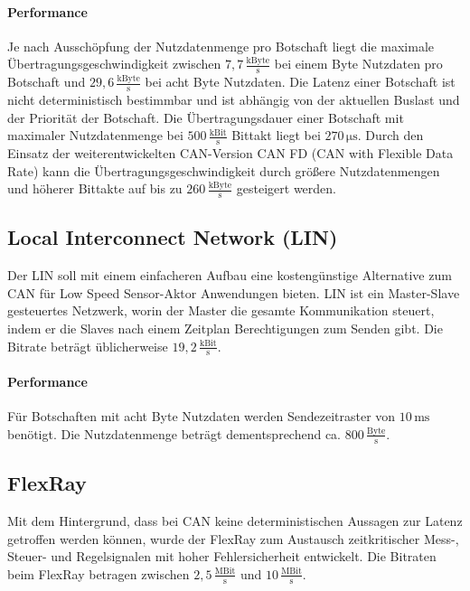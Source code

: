 \paragraph{Performance}
Je nach Ausschöpfung der Nutzdatenmenge pro Botschaft liegt die maximale Übertragungsgeschwindigkeit zwischen $ 7,7\,\frac{\mathrm{kByte}}{\mathrm{s}} $ bei einem Byte Nutzdaten pro Botschaft und $ 29,6\,\frac{\mathrm{kByte}}{\mathrm{s}} $ bei acht Byte Nutzdaten. Die Latenz einer Botschaft ist nicht deterministisch bestimmbar und ist abhängig von der aktuellen Buslast und der Priorität der Botschaft. Die Übertragungsdauer einer Botschaft mit maximaler Nutzdatenmenge bei $ 500\,\frac{\mathrm{kBit}}{\mathrm{s}} $ Bittakt liegt bei $ 270\,\mathrm{\mu s}$.
Durch den Einsatz der weiterentwickelten CAN-Version CAN FD (CAN with Flexible Data Rate) kann die Übertragungsgeschwindigkeit durch größere Nutzdatenmengen und höherer Bittakte auf bis zu $ 260\,\frac{\mathrm{kByte}}{\mathrm{s}} $ gesteigert werden. \cite[Vgl. Seite 76 ff.]{Zimmermann.2014}
\subsection{Local Interconnect Network (LIN)} 
Der LIN soll mit einem einfacheren Aufbau eine kostengünstige Alternative zum CAN für Low Speed Sensor-Aktor Anwendungen bieten.
LIN ist ein Master-Slave gesteuertes Netzwerk, worin der Master die gesamte Kommunikation steuert, indem er die Slaves nach einem Zeitplan Berechtigungen zum Senden gibt. Die Bitrate beträgt üblicherweise $ 19,2\,\frac{\mathrm{kBit}}{\mathrm{s}} $. \cite[Vgl. Seite 79 ff.]{Zimmermann.2014}
\paragraph{Performance}
Für Botschaften mit acht Byte Nutzdaten werden Sendezeitraster von $ 10\,\mathrm{ms} $ benötigt. Die Nutzdatenmenge beträgt dementsprechend ca. $ 800\,\frac{\mathrm{Byte}}{\mathrm{s}} $. \cite[Vgl. Seite 94 f.]{Zimmermann.2014}
\subsection{FlexRay}
Mit dem Hintergrund, dass bei CAN keine deterministischen Aussagen zur Latenz getroffen werden können, wurde der FlexRay zum Austausch zeitkritischer Mess-, Steuer- und Regelsignalen mit hoher Fehlersicherheit entwickelt. Die Bitraten beim FlexRay betragen zwischen $ 2,5\,\frac{\mathrm{MBit}}{\mathrm{s}} $ und $ 10\,\frac{\mathrm{MBit}}{\mathrm{s}} $.
\cite[Vgl. Seite 96 ff.]{Zimmermann.2014}
